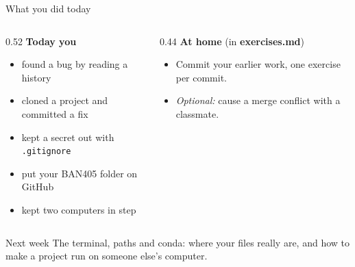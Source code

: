 \documentclass[aspectratio=169,11pt]{beamer}
\newcommand{\code}[1]{\texttt{#1}}
\newcommand{\key}[1]{\textbf{\textcolor{ban}{#1}}}
\begin{document}
\begin{frame}[t]{What you did today}
  \begin{columns}[T]
    \begin{column}{0.52\textwidth}
      \textbf{Today you}
      \small
      \begin{itemize}
        \item found a bug by reading a history
        \item cloned a project and committed a fix
        \item kept a secret out with \code{.gitignore}
        \item put your BAN405 folder on GitHub
        \item kept two computers in step
      \end{itemize}
    \end{column}
    \begin{column}{0.44\textwidth}
      \textbf{At home} {\small (in \key{exercises.md})}
      \small
      \begin{itemize}
        \item Commit your earlier work, one exercise per commit.
        \item \emph{Optional:} cause a merge conflict with a classmate.
      \end{itemize}
    \end{column}
  \end{columns}
  \vfill
  \begin{block}{Next week}
    The terminal, paths and conda: where your files really are, and how to make a project run on someone else's computer.
  \end{block}
\end{frame}
\end{document}
